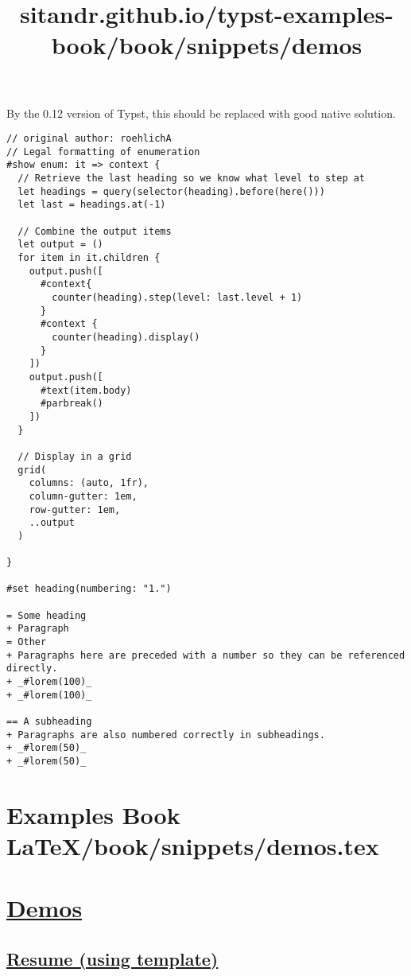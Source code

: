 By the 0.12 version of Typst, this should be replaced with good native
solution.

\begin{verbatim}
// original author: roehlichA
// Legal formatting of enumeration
#show enum: it => context {
  // Retrieve the last heading so we know what level to step at
  let headings = query(selector(heading).before(here()))
  let last = headings.at(-1)

  // Combine the output items
  let output = ()
  for item in it.children {
    output.push([
      #context{
        counter(heading).step(level: last.level + 1)
      }
      #context {
        counter(heading).display() 
      }
    ])
    output.push([
      #text(item.body)
      #parbreak()
    ])
  }

  // Display in a grid
  grid(
    columns: (auto, 1fr),
    column-gutter: 1em,
    row-gutter: 1em,
    ..output
  )

}

#set heading(numbering: "1.")

= Some heading
+ Paragraph
= Other
+ Paragraphs here are preceded with a number so they can be referenced directly.
+ _#lorem(100)_
+ _#lorem(100)_

== A subheading
+ Paragraphs are also numbered correctly in subheadings.
+ _#lorem(50)_
+ _#lorem(50)_
\end{verbatim}

\pandocbounded{}


\section{Examples Book LaTeX/book/snippets/demos.tex}
\title{sitandr.github.io/typst-examples-book/book/snippets/demos}

\section{\texorpdfstring{\hyperref[demos]{Demos}}{Demos}}\label{demos}

\subsection{\texorpdfstring{\hyperref[resume-using-template]{Resume
(using
template)}}{Resume (using template)}}\label{resume-using-template}

